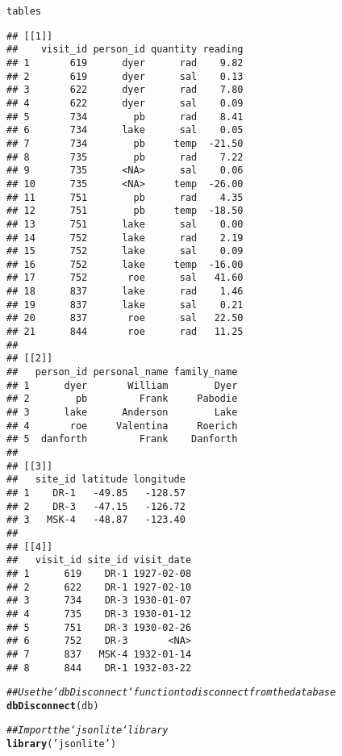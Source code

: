 \documentclass{article}\usepackage[]{graphicx}\usepackage[]{xcolor}
\makeatletter
\newcommand{\hlstr}[1]{\textcolor[rgb]{0.192,0.494,0.8}{#1}}%
\newcommand{\hlcom}[1]{\textcolor[rgb]{0.678,0.584,0.686}{\textit{#1}}}%
\newcommand{\hlstd}[1]{\textcolor[rgb]{0.345,0.345,0.345}{#1}}%
\newcommand{\hlkwd}[1]{\textcolor[rgb]{0.737,0.353,0.396}{\textbf{#1}}}%
\newenvironment{kframe}{%
 \def\at@end@of@kframe{}%
 \ifinner\ifhmode%
  \def\at@end@of@kframe{\end{minipage}}%
  \begin{minipage}{\columnwidth}%
 \fi\fi%
 \def\FrameCommand##1{\hskip\@totalleftmargin \hskip-\fboxsep
 \colorbox{shadecolor}{##1}\hskip-\fboxsep
     \hskip-\linewidth \hskip-\@totalleftmargin \hskip\columnwidth}%
 \MakeFramed {\advance\hsize-\width
   \@totalleftmargin\z@ \linewidth\hsize
   \@setminipage}}%
 {\par\unskip\endMakeFramed%
 \at@end@of@kframe}
\newenvironment{knitrout}{}{} %
\makeatother
\begin{document}
\begin{knitrout}
\begin{kframe}
{\ttfamily\noindent\color{warningcolor}{\#\# Warning in result\_fetch(res@ptr, n = n): Column `reading`: mixed type, first seen values of type real, coercing other values of type string}}\begin{alltt}
\hlstd{tables}
\end{alltt}
\begin{verbatim}
## [[1]]
##    visit_id person_id quantity reading
## 1       619      dyer      rad    9.82
## 2       619      dyer      sal    0.13
## 3       622      dyer      rad    7.80
## 4       622      dyer      sal    0.09
## 5       734        pb      rad    8.41
## 6       734      lake      sal    0.05
## 7       734        pb     temp  -21.50
## 8       735        pb      rad    7.22
## 9       735      <NA>      sal    0.06
## 10      735      <NA>     temp  -26.00
## 11      751        pb      rad    4.35
## 12      751        pb     temp  -18.50
## 13      751      lake      sal    0.00
## 14      752      lake      rad    2.19
## 15      752      lake      sal    0.09
## 16      752      lake     temp  -16.00
## 17      752       roe      sal   41.60
## 18      837      lake      rad    1.46
## 19      837      lake      sal    0.21
## 20      837       roe      sal   22.50
## 21      844       roe      rad   11.25
## 
## [[2]]
##   person_id personal_name family_name
## 1      dyer       William        Dyer
## 2        pb         Frank     Pabodie
## 3      lake      Anderson        Lake
## 4       roe     Valentina     Roerich
## 5  danforth         Frank    Danforth
## 
## [[3]]
##   site_id latitude longitude
## 1    DR-1   -49.85   -128.57
## 2    DR-3   -47.15   -126.72
## 3   MSK-4   -48.87   -123.40
## 
## [[4]]
##   visit_id site_id visit_date
## 1      619    DR-1 1927-02-08
## 2      622    DR-1 1927-02-10
## 3      734    DR-3 1930-01-07
## 4      735    DR-3 1930-01-12
## 5      751    DR-3 1930-02-26
## 6      752    DR-3       <NA>
## 7      837   MSK-4 1932-01-14
## 8      844    DR-1 1932-03-22
\end{verbatim}
\begin{alltt}
\hlcom{## Use the `dbDisconnect` function to disconnect from the database}
\hlkwd{dbDisconnect}\hlstd{(db)}

\hlcom{## Import the `jsonlite` library}
\hlkwd{library}\hlstd{(}\hlstr{'jsonlite'}\hlstd{)}


\end{alltt}
\end{kframe}
\end{knitrout}
\end{document}
